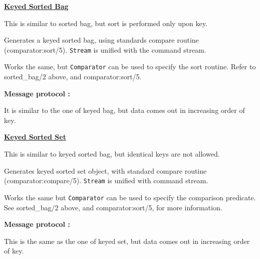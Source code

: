 \noindent\underline{\bf Keyed Sorted Bag}
\vspace{1ex}\par
This is similar to sorted bag, but sort is performed only upon key.
\begin{itemize}

Generates a keyed sorted bag, using standards compare routine
(comparator:sort/5). \verb|Stream| is unified with the command stream.

Works the same, but \verb|Comparator| can be used to specify the sort routine.
Refer to sorted_bag/2 above, and comparator:sort/5.

\end{itemize}
{\bf Message protocol :}\par
It is similar to the one of keyed bag, but data comes out in increasing order
of key.
\vspace{1ex}

\noindent\underline{\bf Keyed Sorted Set}
\vspace{1ex}\par
This is similar to keyed sorted bag, but identical keys are not allowed.
\begin{itemize}

Generates keyed sorted set object, with standard compare routine
(comparator:compare/5). \verb|Stream| is unified with command stream.

Works the same but \verb|Comparator| can be used to specify the comparison
predicate. See sorted_bag/2 above, and comparator:sort/5, for more information.

\end{itemize}
{\bf Message protocol :}\par
This is the same as the one of keyed set, but data comes out in increasing
order of key.

\newpage
{}

